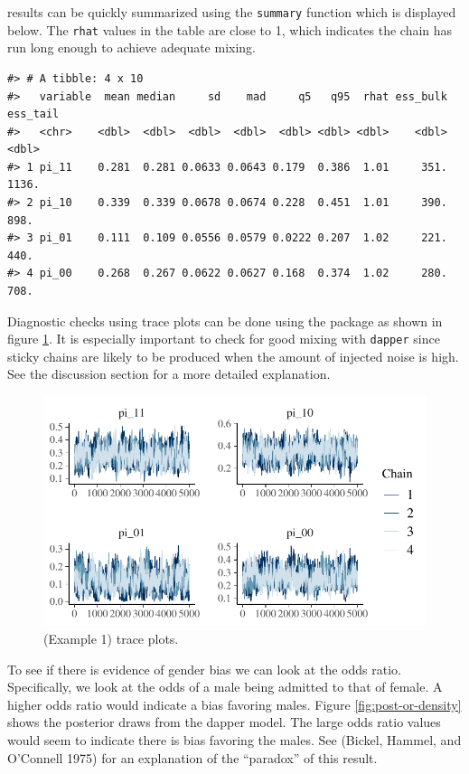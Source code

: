 results can be quickly summarized using the \texttt{summary} function which is
displayed below. The \texttt{rhat} values in the table are close to 1, which indicates
the chain has run long enough to achieve adequate mixing.

\begin{verbatim}
#> # A tibble: 4 x 10
#>   variable  mean median     sd    mad     q5   q95  rhat ess_bulk ess_tail
#>   <chr>    <dbl>  <dbl>  <dbl>  <dbl>  <dbl> <dbl> <dbl>    <dbl>    <dbl>
#> 1 pi_11    0.281  0.281 0.0633 0.0643 0.179  0.386  1.01     351.    1136.
#> 2 pi_10    0.339  0.339 0.0678 0.0674 0.228  0.451  1.01     390.     898.
#> 3 pi_01    0.111  0.109 0.0556 0.0579 0.0222 0.207  1.02     221.     440.
#> 4 pi_00    0.268  0.267 0.0622 0.0627 0.168  0.374  1.02     280.     708.
\end{verbatim}

Diagnostic checks using trace plots can be done using the  package
as shown in figure \ref{fig:trace-plot}. It is especially important to check for good mixing
with \texttt{dapper} since sticky chains are likely to be produced
when the amount of injected noise is high. See the discussion section
for a more detailed explanation.

\begin{figure}

{\centering \includegraphics{dppaper_files/figure-latex/trace-plot-1} 

}

\caption{(Example 1) trace plots.}\label{fig:trace-plot}
\end{figure}

To see if there is evidence of gender bias we can look at the odds ratio.
Specifically, we look at the odds of a male being admitted to
that of female. A higher odds ratio would indicate a bias
favoring males. Figure \ref{fig:post-or-density} shows the posterior draws
from the dapper model. The large odds ratio values would seem
to indicate there is bias favoring the males. See (Bickel, Hammel, and O'Connell 1975) for
an explanation of the ``paradox'' of this result.


